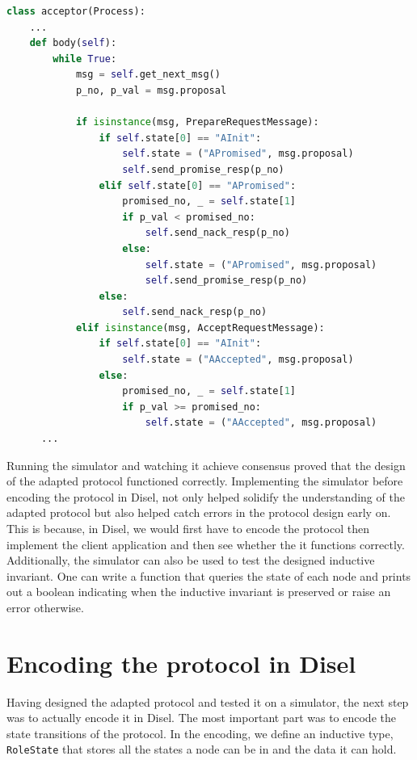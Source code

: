 \begin{lstlisting}[language=Python]
class acceptor(Process):
    ...
    def body(self):
        while True:
            msg = self.get_next_msg()
            p_no, p_val = msg.proposal

            if isinstance(msg, PrepareRequestMessage):
                if self.state[0] == "AInit":
                    self.state = ("APromised", msg.proposal)
                    self.send_promise_resp(p_no)
                elif self.state[0] == "APromised":
                    promised_no, _ = self.state[1]
                    if p_val < promised_no:
                        self.send_nack_resp(p_no)
                    else:
                        self.state = ("APromised", msg.proposal)
                        self.send_promise_resp(p_no)
                else:
                    self.send_nack_resp(p_no)
            elif isinstance(msg, AcceptRequestMessage):
                if self.state[0] == "AInit":
                    self.state = ("AAccepted", msg.proposal)
                else:
                    promised_no, _ = self.state[1]
                    if p_val >= promised_no:
                        self.state = ("AAccepted", msg.proposal)
      ...
\end{lstlisting}

Running the simulator and watching it achieve consensus proved that the design
of the adapted protocol functioned correctly. Implementing the simulator before
encoding the protocol in Disel, not only helped solidify the understanding
of the adapted protocol but also helped catch errors in the protocol design
early on. This is because, in Disel, we would first have to encode the
protocol then implement the client application and then see whether the it
functions correctly. Additionally, the simulator can also be used to test the
designed inductive invariant. One can write a function that queries the state of
each node and prints out a boolean indicating when the inductive invariant is
preserved or raise an error otherwise.

\section{Encoding the protocol in Disel}
Having designed the adapted protocol and tested it on a simulator, the next
step was to actually encode it in Disel. The most important part was to encode
the state transitions of the protocol. In the encoding, we define an inductive
type, \texttt{RoleState} that stores all the states a node can be in and the
data it can hold.

